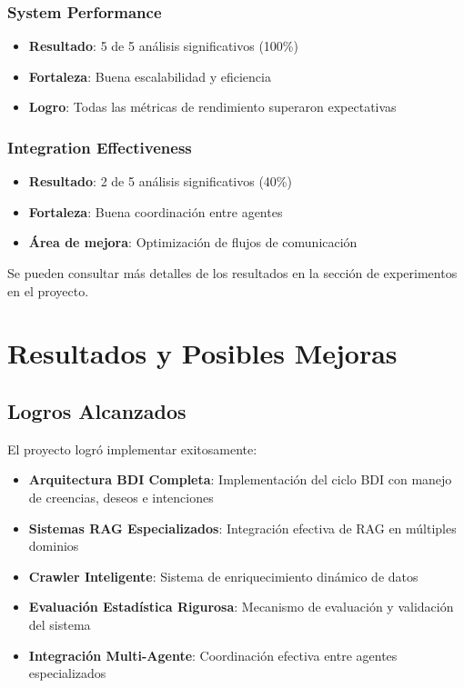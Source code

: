 \documentclass[runningheads,a4paper]{llncs}
\begin{document}
\subsubsection{System Performance}
\begin{itemize}
    \item \textbf{Resultado}: 5 de 5 análisis significativos (100\%)
    \item \textbf{Fortaleza}: Buena escalabilidad y eficiencia
    \item \textbf{Logro}: Todas las métricas de rendimiento superaron expectativas
\end{itemize}

\subsubsection{Integration Effectiveness}
\begin{itemize}
    \item \textbf{Resultado}: 2 de 5 análisis significativos (40\%)
    \item \textbf{Fortaleza}: Buena coordinación entre agentes
    \item \textbf{Área de mejora}: Optimización de flujos de comunicación
\end{itemize}

Se pueden consultar más detalles de los resultados en la sección de experimentos en el proyecto.

\section{Resultados y Posibles Mejoras}

\subsection{Logros Alcanzados}

El proyecto logró implementar exitosamente:

\begin{itemize}
    \item \textbf{Arquitectura BDI Completa}: Implementación del ciclo BDI con manejo de creencias, deseos e intenciones
    \item \textbf{Sistemas RAG Especializados}: Integración efectiva de RAG en múltiples dominios
    \item \textbf{Crawler Inteligente}: Sistema de enriquecimiento dinámico de datos
    \item \textbf{Evaluación Estadística Rigurosa}: Mecanismo de evaluación y validación del sistema
    \item \textbf{Integración Multi-Agente}: Coordinación efectiva entre agentes especializados
\end{itemize}
\end{document}
